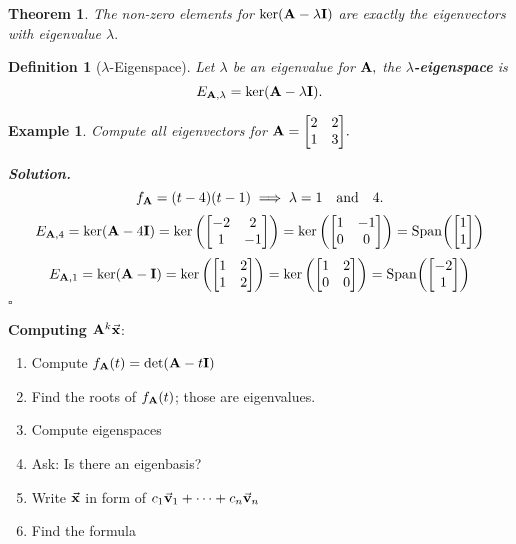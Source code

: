 \documentclass[12pt, a4paper]{article}
\newtheorem{thm}{Theorem}[subsection]
\newtheorem{df}{Definition}[subsection]
\newtheorem{eg}{Example}[subsection]
\newenvironment*{sol}{\par\indent\textbf{\textit{Solution. }}}{\hfill{$\square$}\par}
\def\Span{\mathrm{Span}}
\def\vecx{\va{x}}
\def\vecv{\va{v}}
\def\matrixA{\vb{A}}
\def\matrixI{\vb{I}}
\begin{document}
\begin{thm}
	The non-zero elements for $\ker(\matrixA-\lambda\matrixI)$ are exactly the eigenvectors with eigenvalue $\lambda.$	
\end{thm}
\begin{df}[$\lambda$-Eigenspace]
	Let $\lambda$ be an eigenvalue for $\matrixA,$ the \textbf{$\lambda$-eigenspace} is \[E_{\matrixA,\lambda}=\ker(\matrixA-\lambda\matrixI).\]
\end{df}
\begin{eg}
	Compute all eigenvectors for $\matrixA=\mqty[2&2\\1&3].$
	\begin{sol}
		\[f_{\matrixA}=(t-4)(t-1)\implies\lambda=1\quad\text{and}\quad4.\]
		\[E_{\matrixA,4}=\ker(\matrixA-4\matrixI)=\ker\qty(\mqty[-2&2\\1&-1])=\ker\qty(\mqty[1&-1\\0&0])=\Span\qty(\mqty[1\\1])\]
		\[E_{\matrixA,1}=\ker(\matrixA-\matrixI)=\ker\qty(\mqty[1&2\\1&2])=\ker\qty(\mqty[1&2\\0&0])=\Span\qty(\mqty[-2\\1])\]
	\end{sol}
\end{eg}
\begin{framed}
\textbf{Computing $\matrixA^{k}\vecx$}:
\begin{enumerate}
	\item Compute $f_{\matrixA}(t)=\det(\matrixA-t\matrixI)$
	\item Find the roots of $f_{\matrixA}(t)$; those are eigenvalues.
	\item Compute eigenspaces
	\item Ask: Is there an eigenbasis?
	\item Write $\vecx$ in form of $c_1\vecv_1+\cdots+c_n\vecv_n$
	\item Find the formula
\end{enumerate}	
\end{framed}
\end{document}
